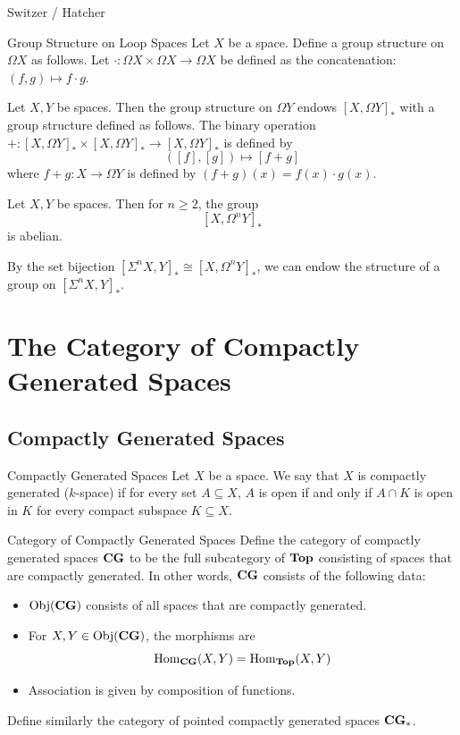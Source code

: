 \documentclass[a4paper]{article}
\begin{document}
Switzer / Hatcher

\begin{defn}{Group Structure on Loop Spaces}{} Let $X$ be a space. Define a group structure on $\Omega X$ as follows. Let $\cdot:\Omega X\times\Omega X\to\Omega X$ be defined as the concatenation: $(f,g)\mapsto f\cdot g$. 
\end{defn}

\begin{prp}{}{} Let $X,Y$ be spaces. Then the group structure on $\Omega Y$ endows $[X,\Omega Y]_\ast$ with a group structure defined as follows. The binary operation $+:[X,\Omega Y]_\ast\times[X,\Omega Y]_\ast\to[X,\Omega Y]_\ast$ is defined by $$([f],[g])\mapsto[f+g]$$ where $f+g:X\to\Omega Y$ is defined by $(f+g)(x)=f(x)\cdot g(x)$. 
\end{prp}

\begin{prp}{}{} Let $X,Y$ be spaces. Then for $n\geq 2$, the group $$[X,\Omega^n Y]_\ast$$ is abelian. 
\end{prp}

By the set bijection $[\Sigma^nX,Y]_\ast\cong[X,\Omega^nY]_\ast$, we can endow the structure of a group on $[\Sigma^nX,Y]_\ast$. 

\pagebreak
\section{The Category of Compactly Generated Spaces}
\subsection{Compactly Generated Spaces}
\begin{defn}{Compactly Generated Spaces}{} Let $X$ be a space. We say that $X$ is compactly generated ($k$-space) if for every set $A\subseteq X$, $A$ is open if and only if $A\cap K$ is open in $K$ for every compact subspace $K\subseteq X$. 
\end{defn}

\begin{defn}{Category of Compactly Generated Spaces}{} Define the category of compactly generated spaces $\bold{CG}$ to be the full subcategory of $\bold{Top}$ consisting of spaces that are compactly generated. In other words, $\bold{CG}$ consists of the following data: 
\begin{itemize}
\item $\text{Obj}(\bold{CG})$ consists of all spaces that are compactly generated. 
\item For $X,Y\in\text{Obj}(\bold{CG})$, the morphisms are $$\operatorname{Hom}_{\bold{CG}}(X,Y)=\operatorname{Hom}_{\bold{Top}}(X,Y)$$
\item Association is given by composition of functions. 
\end{itemize}
Define similarly the category of pointed compactly generated spaces $\bold{CG}_\ast$. 
\end{defn}
\end{document}
